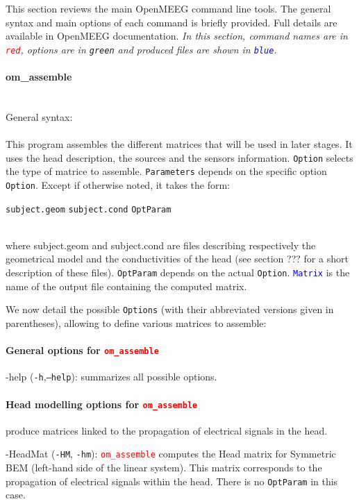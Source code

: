 \documentclass[10pt,journal]{book}
\newcommand{\command}[1]{\framebox[\textwidth][l]{\tt \$ #1}}
\newcommand{\commandTitle}[1]{\paragraph*{\textbf{#1}}\mbox{ }\\}
\newcommand{\commandName}[1]{\textcolor{red}{\tt #1}}
\newcommand{\optionName}[1]{\textcolor{OliveGreen}{\tt #1}}
\newcommand{\outputName}[1]{\textcolor{blue}{\tt #1}}
\newcommand{\Param}[1]{{\tt #1}}
\newcommand*\OptionsLabel[1]{\optionName{#1}}
\newenvironment{Options}{
    \begin{list}{}{
        \let\makelabel\OptionsLabel\setlength\labelwidth{30pt}%
        \setlength\leftmargin{\labelwidth+\labelsep}}}
    {\end{list}}
\begin{document}
This section reviews the main OpenMEEG command line tools. The general syntax and main options of each command is briefly provided.
Full details are available in OpenMEEG documentation. \emph{In this section, command names are in \commandName{red}, options are in \optionName{green} and produced files are shown in \outputName{blue}.}

    \newpage

    \commandTitle{om\_assemble}
        General syntax:\\[2mm]
        \command{\commandName{om\_assemble} \optionName{Option} \optionName{Parameters} \outputName{Matrix}}\\[2mm]
        This program assembles the different matrices that will be used in
        later stages. It uses the head description, the sources and the sensors information. \optionName{Option} selects the type of matrice to assemble.
        \optionName{Parameters} depends on the specific option \optionName{Option}.
        Except if otherwise noted, it takes the form:\\
        \centerline{\Param{subject.geom} \Param{subject.cond} \optionName{OptParam}}\\
        where subject.geom and subject.cond are files describing respectively the geometrical model and the conductivities of the head (see section ???
        for a short description of these files). \optionName{OptParam} depends on the actual \optionName{Option}. \outputName{Matrix} is the name of the output file
        containing the computed matrix.

        We now detail the possible \optionName{Options} (with their abbreviated versions given in parentheses), allowing to define various matrices to assemble:

        \paragraph*{General options for \commandName{om\_assemble}}
            \begin{Options}
                \item[-help] (\optionName{-h},\optionName{--help}):  summarizes all possible options.
            \end{Options}

        \paragraph*{Head modelling options for \commandName{om\_assemble}} produce matrices linked to the propagation of electrical signals in the head.
            \begin{Options}
                \item[-HeadMat] (\optionName{-HM}, \optionName{-hm}): \commandName{om\_assemble} computes the Head matrix for Symmetric BEM (left-hand side
                        of the linear system). This matrix corresponds to the propagation of electrical signals within the head.
                        There is no \optionName{OptParam} in this case.
            \end{Options}
\end{document}
